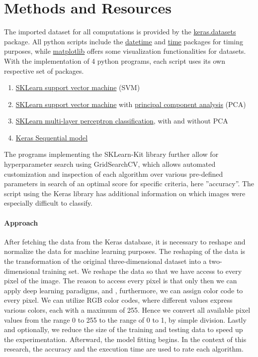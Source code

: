\chapter{Methods and Resources}
The imported dataset for all computations is provided by the \href{https://keras.io/api/datasets/mnist/}{keras.datasets} package.
All python scripts include the \href{https://docs.python.org/3/library/datetime.html}{datetime} and \href{https://docs.python.org/3/library/time.html}{time} packages for timing purposes, while \href{https://matplotlib.org/}{matplotlib} offers some visualization functionalities for datasets.
With the implementation of 4 python programs, each script uses its own respective set of packages.

\begin{enumerate}
    \item \href{https://scikit-learn.org/stable/modules/generated/sklearn.svm.SVC.html}{SKLearn support vector machine} (SVM)
    \item \href{https://scikit-learn.org/stable/modules/generated/sklearn.svm.SVC.html}{SKLearn support vector machine} with \href{https://scikit-learn.org/stable/modules/generated/sklearn.decomposition.PCA.html}{principal component analysis} (PCA)
    \item \href{https://scikit-learn.org/stable/modules/generated/sklearn.neural_network.MLPClassifier.html}{SKLearn multi-layer perceptron classification}, with and without PCA
    \item \href{https://keras.io/guides/sequential_model/}{Keras Sequential model}
\end{enumerate}

The programs implementing the SKLearn-Kit library further allow for hyperparameter search using GridSearchCV, which allows automated customization and inspection of each algorithm over various pre-defined parameters in search of an optimal score for specific criteria, here ''accuracy''. The script using the Keras library has additional information on which images were especially difficult to classify.

\subsubsection{Approach}
After fetching the data from the Keras database, it is necessary to reshape and normalize the data for machine learning purposes.
The reshaping of the data is the transformation of the original three-dimensional dataset into a two-dimensional training set.
We reshape the data so that we have access to every pixel of the image.
The reason to access every pixel is that only then we can apply deep learning paradigms, and , furthermore, we can assign color code to every pixel.
We can utilize RGB color codes, where different values express various colors, each with a maximum of 255. Hence we convert all available pixel values from the range 0 to 255 to the range of 0 to 1, by simple division.
Lastly and optionally, we reduce the size of the training and testing data to speed up the experimentation.
Afterward, the model fitting begins. In the context of this research, the accuracy and the execution time are used to rate each algorithm.